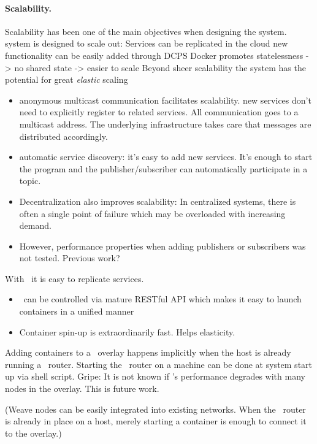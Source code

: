 \paragraph{Scalability.}
Scalability has been one of the main objectives when designing the system.
system is designed to scale out: 
Services can be replicated in the cloud
new functionality can be easily added through DCPS
Docker promotes statelessness -> no shared state -> easier to scale
Beyond sheer scalability the system has the potential for great \emph{elastic} scaling

\begin{itemize}
\item anonymous multicast communication facilitates scalability. new services don't need to explicitly register to related services. All communication goes to a multicast address. The underlying infrastructure takes care that messages are distributed accordingly.
\item automatic service discovery: it's easy to add new services. It's enough to start the program and the publisher/subscriber can automatically participate in a topic.
\item Decentralization also improves scalability: In centralized systems, there is often a single point of failure which may be overloaded with increasing demand. 
\item However, performance properties when adding publishers or subscribers was not tested. Previous work?
\end{itemize}

With \docker\ it is easy to replicate services. 
\begin{itemize}
\item \docker\ can be controlled via mature RESTful API which makes it easy to launch containers in a unified manner
\item Container spin-up is extraordinarily fast. Helps elasticity.
\end{itemize}

Adding containers to a \weave\ overlay happens implicitly when the host is already running a \weave\ router. Starting the \weave\ router on a machine can be done at system start up via shell script. Gripe: It is not known if \weave 's performance degrades with many nodes in the overlay. This is future work.

(Weave nodes can be easily integrated into existing networks. When the \weave\ router is already in place on a host, merely starting a container is enough to connect it to the overlay.)

